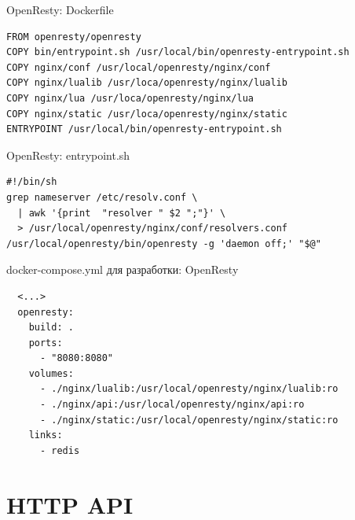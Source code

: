 \documentclass[aspectratio=169,handout,bigger]{beamer}
\begin{document}

\begin{frame}[fragile]{OpenResty: Dockerfile}
\begin{verbatim}
FROM openresty/openresty
COPY bin/entrypoint.sh /usr/local/bin/openresty-entrypoint.sh
COPY nginx/conf /usr/local/openresty/nginx/conf
COPY nginx/lualib /usr/loca/openresty/nginx/lualib
COPY nginx/lua /usr/loca/openresty/nginx/lua
COPY nginx/static /usr/loca/openresty/nginx/static
ENTRYPOINT /usr/local/bin/openresty-entrypoint.sh
\end{verbatim}
\end{frame}


\begin{frame}[fragile]{OpenResty: entrypoint.sh}
\begin{verbatim}
#!/bin/sh
grep nameserver /etc/resolv.conf \
  | awk '{print  "resolver " $2 ";"}' \
  > /usr/local/openresty/nginx/conf/resolvers.conf
/usr/local/openresty/bin/openresty -g 'daemon off;' "$@"
\end{verbatim}
\end{frame}


\begin{frame}[fragile]{docker-compose.yml для разработки: OpenResty}
\begin{verbatim}
  <...>
  openresty:
    build: .
    ports:
      - "8080:8080"
    volumes:
      - ./nginx/lualib:/usr/local/openresty/nginx/lualib:ro
      - ./nginx/api:/usr/local/openresty/nginx/api:ro
      - ./nginx/static:/usr/local/openresty/nginx/static:ro
    links:
      - redis
\end{verbatim}
\end{frame}


\section{HTTP API}

\end{document}

